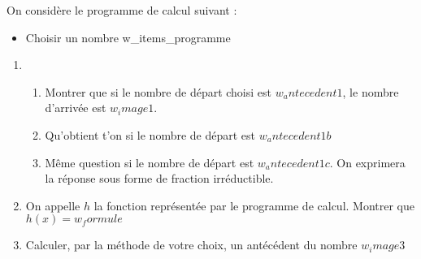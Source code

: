 \begin{exo}
    On considère le programme de calcul suivant : 
    \begin{itemize}
        \item Choisir un nombre
        {w_items_programme}
    \end{itemize}

    \begin{enumerate}
        \item \begin{enumerate} 
            \item Montrer que si le nombre de départ choisi est ${w_antecedent1}$, le nombre d'arrivée est ${w_image1}$.
            \item Qu'obtient t'on si le nombre de départ est ${w_antecedent1b}$
            \item Même question si le nombre de départ est ${w_antecedent1c}$. On exprimera la réponse sous forme de fraction irréductible.
        \end{enumerate}
        \item On appelle $h$ la fonction représentée par le programme de calcul. Montrer que $h(x)={w_formule}$
        \item Calculer, par la méthode de votre choix, un antécédent du nombre ${w_image3}$
    \end{enumerate}

\end{exo}
\vspace{0.5cm}

